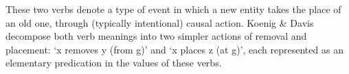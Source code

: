 \documentclass[output=paper
                ,modfonts
                ,nonflat
	        ,collection
	        ,collectionchapter
	        ,collectiontoclongg
 	        ,biblatex
                ,babelshorthands
                ,newtxmath
                ,draftmode
                ,colorlinks, citecolor=brown
]{./langsci/langscibook}
\begin{document}
These two verbs denote a type of event in which a new entity takes the place of an old one, through (typically intentional) causal action.
Koenig \& Davis decompose both verb meanings into two simpler actions of removal and placement: `x removes y (from g)' and `x places z (at g)', each represented as an elementary predication in the  values of these verbs.  


\end{document}
